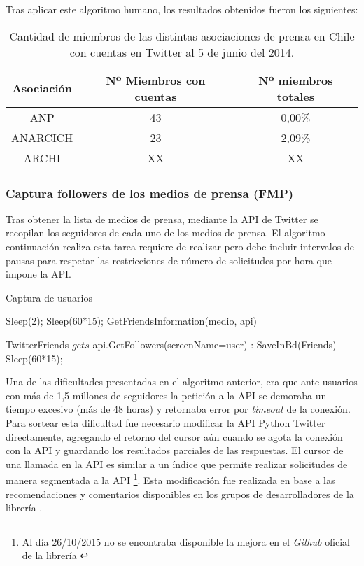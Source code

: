 Tras aplicar este algoritmo humano, los resultados obtenidos fueron los siguientes:

\begin{table}[H]
	\centering
	\begin{tabular}{|c|c|c|}
		\hline
		Asociación & Nº Miembros con cuentas & Nº miembros totales \\ \hline
		ANP & 43 & 0,00\% \\ \hline
		ANARCICH & 23 & 2,09\% \\ \hline
		ARCHI & XX & XX \\ \hline
	\end{tabular}
	\caption {Cantidad de miembros de las distintas asociaciones de prensa en Chile con cuentas en Twitter al 5 de junio del 2014.}
\end{table}


\subsubsection{Captura followers de los medios de prensa (FMP)}

Tras obtener la lista de medios de prensa, mediante la API de Twitter se recopilan los seguidores de cada uno de los medios de prensa. El algoritmo continuación realiza esta tarea requiere de realizar pero debe incluir intervalos de pausas para respetar las restricciones de número de solicitudes por hora que impone la API.

\begin{algorithm}[H]
	\caption{Captura de usuarios}\label{capturaUsuarios}
	\begin{algorithmic}[1]
		\State Sleep(2);
		\Else
		\State Sleep(60*15);
		\State GetFriendsInformation(medio, api)
		\EndIf
		\EndFor
		\EndFunction
		
		\State TwitterFriends $gets$ api.GetFollowers(screenName=user)
		:
		\State SaveInBd(Friends)
		\EndFor
		\Else
		\State Sleep(60*15);
		\EndIf
		\EndFunction
		
	\end{algorithmic}
\end{algorithm}

Una de las dificultades presentadas en el algoritmo anterior, era que ante usuarios con más de 1,5 millones de seguidores la petición a la API se demoraba un tiempo excesivo (más de 48 horas) y retornaba error por \emph{timeout} de la conexión. Para sortear esta dificultad fue necesario modificar la API Python Twitter directamente, agregando el retorno del cursor aún cuando se agota la conexión con la API y guardando los resultados parciales de las respuestas. El cursor de una llamada en la API es similar a un índice que permite realizar solicitudes de manera segmentada a la API \footnote{ Al día 26/10/2015 no se encontraba disponible la mejora en el \emph{Github} oficial de la librería \cite{pythonTwitterGithub} }. Esta modificación fue realizada en base a las recomendaciones y comentarios disponibles en los grupos de desarrolladores de la librería \cite{pythonTwitterCode} \cite{pythonTwitterGithub}. 

